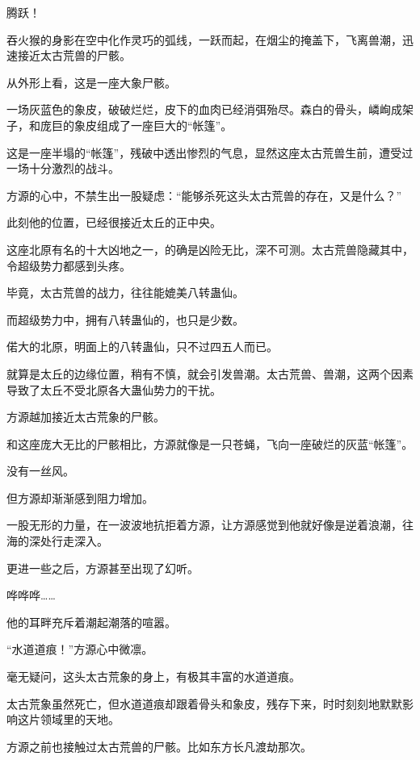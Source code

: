 
\begin{this_body}



腾跃！

吞火猴的身影在空中化作灵巧的弧线，一跃而起，在烟尘的掩盖下，飞离兽潮，迅速接近太古荒兽的尸骸。

从外形上看，这是一座大象尸骸。

一场灰蓝色的象皮，破破烂烂，皮下的血肉已经消弭殆尽。森白的骨头，嶙峋成架子，和庞巨的象皮组成了一座巨大的“帐篷”。

这是一座半塌的“帐篷”，残破中透出惨烈的气息，显然这座太古荒兽生前，遭受过一场十分激烈的战斗。

方源的心中，不禁生出一股疑虑：“能够杀死这头太古荒兽的存在，又是什么？”

此刻他的位置，已经很接近太丘的正中央。

这座北原有名的十大凶地之一，的确是凶险无比，深不可测。太古荒兽隐藏其中，令超级势力都感到头疼。

毕竟，太古荒兽的战力，往往能媲美八转蛊仙。

而超级势力中，拥有八转蛊仙的，也只是少数。

偌大的北原，明面上的八转蛊仙，只不过四五人而已。

就算是太丘的边缘位置，稍有不慎，就会引发兽潮。太古荒兽、兽潮，这两个因素导致了太丘不受北原各大蛊仙势力的干扰。

方源越加接近太古荒象的尸骸。

和这座庞大无比的尸骸相比，方源就像是一只苍蝇，飞向一座破烂的灰蓝“帐篷”。

没有一丝风。

但方源却渐渐感到阻力增加。

一股无形的力量，在一波波地抗拒着方源，让方源感觉到他就好像是逆着浪潮，往海的深处行走深入。

更进一些之后，方源甚至出现了幻听。

哗哗哗……

他的耳畔充斥着潮起潮落的喧嚣。

“水道道痕！”方源心中微凛。

毫无疑问，这头太古荒象的身上，有极其丰富的水道道痕。

太古荒象虽然死亡，但水道道痕却跟着骨头和象皮，残存下来，时时刻刻地默默影响这片领域里的天地。

方源之前也接触过太古荒兽的尸骸。比如东方长凡渡劫那次。


\end{this_body}
